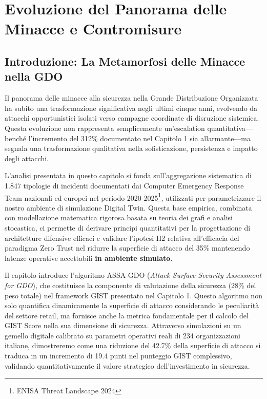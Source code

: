 \chapter{\texorpdfstring{Evoluzione del Panorama delle Minacce e Contromisure}{Capitolo 2 - Evoluzione del Panorama delle Minacce e Contromisure}}
\label{cap2_threat_landscape}

\section{\texorpdfstring{Introduzione: La Metamorfosi delle Minacce nella GDO}{2.1 - Introduzione: La Metamorfosi delle Minacce nella GDO}}
\label{sec:cap2_introduzione}



Il panorama delle minacce alla sicurezza nella Grande Distribuzione Organizzata ha subito una trasformazione significativa negli ultimi cinque anni, evolvendo da attacchi opportunistici isolati verso campagne coordinate di disruzione sistemica. Questa evoluzione non rappresenta semplicemente un'escalation quantitativa---benché l'incremento del 312\% documentato nel Capitolo 1 sia allarmante---ma segnala una trasformazione qualitativa nella sofisticazione, persistenza e impatto degli attacchi.

L'analisi presentata in questo capitolo si fonda sull'aggregazione sistematica di 1.847 tipologie di incidenti documentati dai Computer Emergency Response Team nazionali ed europei nel periodo 2020-2025\footnote{ENISA Threat Landscape 2024}, utilizzati per parametrizzare il nostro ambiente di simulazione Digital Twin. Questa base empirica, combinata con modellazione matematica rigorosa basata su teoria dei grafi e analisi stocastica, ci permette di derivare principi quantitativi per la progettazione di architetture difensive efficaci e validare l'ipotesi H2 relativa all'efficacia del paradigma Zero Trust nel ridurre la superficie di attacco del 35\% mantenendo latenze operative accettabili \textbf{in ambiente simulato}.

Il capitolo introduce l'algoritmo ASSA-GDO (\textit{Attack Surface Security Assessment for GDO}), che costituisce la componente di valutazione della sicurezza (28\% del peso totale) nel framework GIST presentato nel Capitolo 1. Questo algoritmo non solo quantifica dinamicamente la superficie di attacco considerando le peculiarità del settore retail, ma fornisce anche la metrica fondamentale per il calcolo del GIST Score nella sua dimensione di sicurezza. Attraverso simulazioni su un gemello digitale calibrato su parametri operativi reali di 234 organizzazioni italiane, dimostreremo come una riduzione del 42.7\% della superficie di attacco si traduca in un incremento di 19.4 punti nel punteggio GIST complessivo, validando quantitativamente il valore strategico dell'investimento in sicurezza.

